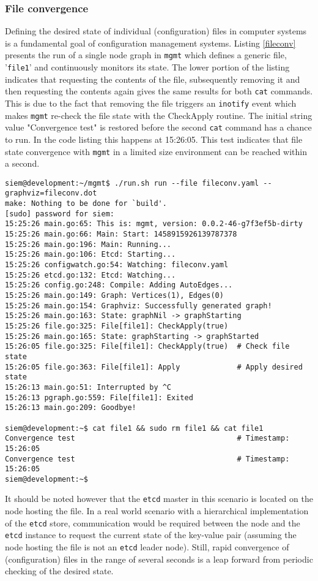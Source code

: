 \subsubsection{File convergence}
Defining the desired state of individual (configuration) files in computer systems is a fundamental goal of configuration management systems. Listing \ref{fileconv} presents the run of a single node graph in \texttt{mgmt} which defines a generic file, '\texttt{file1}' and continuously monitors its state. The lower portion of the listing indicates that requesting the contents of the file, subsequently removing it and then requesting the contents again gives the same results for both \texttt{cat} commands. This is due to the fact that removing the file triggers an \texttt{inotify} event which makes \texttt{mgmt} re-check the file state with the CheckApply routine. The initial string value "Convergence test" is restored before the second \texttt{cat} command has a chance to run. In the code listing this happens at 15:26:05. This test indicates that file state convergence with \texttt{mgmt} in a limited size environment can be reached within a second.
\\
\begin{lstlisting}[caption={Rapid file convergence in \texttt{mgmt}},label=fileconv]
siem@development:~/mgmt$ ./run.sh run --file fileconv.yaml --graphviz=fileconv.dot
make: Nothing to be done for `build'.
[sudo] password for siem: 
15:25:26 main.go:65: This is: mgmt, version: 0.0.2-46-g7f3ef5b-dirty
15:25:26 main.go:66: Main: Start: 1458915926139787378
15:25:26 main.go:196: Main: Running...
15:25:26 main.go:106: Etcd: Starting...
15:25:26 configwatch.go:54: Watching: fileconv.yaml
15:25:26 etcd.go:132: Etcd: Watching...
15:25:26 config.go:248: Compile: Adding AutoEdges...
15:25:26 main.go:149: Graph: Vertices(1), Edges(0)
15:25:26 main.go:154: Graphviz: Successfully generated graph!
15:25:26 main.go:163: State: graphNil -> graphStarting
15:25:26 file.go:325: File[file1]: CheckApply(true)
15:25:26 main.go:165: State: graphStarting -> graphStarted
15:26:05 file.go:325: File[file1]: CheckApply(true)  # Check file state
15:26:05 file.go:363: File[file1]: Apply             # Apply desired state 
15:26:13 main.go:51: Interrupted by ^C
15:26:13 pgraph.go:559: File[file1]: Exited
15:26:13 main.go:209: Goodbye!

siem@development:~$ cat file1 && sudo rm file1 && cat file1 
Convergence test                                     # Timestamp: 15:26:05
Convergence test                                     # Timestamp: 15:26:05
siem@development:~$
\end{lstlisting}
\noindent
It should be noted however that the \texttt{etcd} master in this scenario is located on the node hosting the file. In a real world scenario with a hierarchical implementation of the \texttt{etcd} store, communication would be required between the node and the \texttt{etcd} instance to request the current state of the key-value pair (assuming the node hosting the file is not an \texttt{etcd} leader node). Still, rapid convergence of (configuration) files in the range of several seconds is a leap forward from periodic checking of the desired state.

